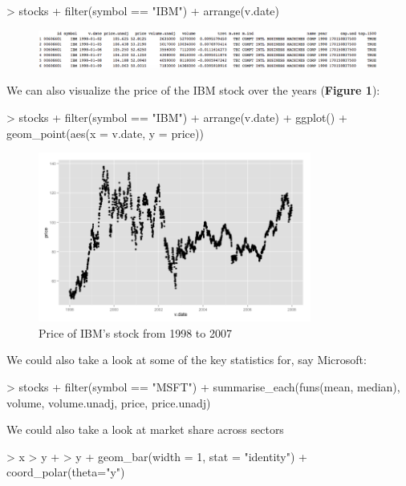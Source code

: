 \begin{example}
> stocks %
+  filter(symbol == "IBM") %
+  arrange(v.date) %
\end{example}

\begin{figure}[h!]
  \centering
    \includegraphics[width=1.2\textwidth]{IBM1}
\end{figure}

\noindent We can also visualize the price of the IBM stock over the years (\textbf{Figure 1}):

\begin{example}
> stocks %
+  filter(symbol == "IBM") %
+  arrange(v.date) %
+  ggplot() + geom_point(aes(x = v.date, y = price))
\end{example}

\begin{figure}[h!]
  \centering
    \includegraphics[width=0.8\textwidth]{IBM2}
  \caption{Price of IBM's stock from 1998 to 2007}
\end{figure}

\noindent We could also take a look at some of the key statistics for, say Microsoft: 

\begin{example}
> stocks %
+  filter(symbol == "MSFT") %
+  summarise_each(funs(mean, median), volume, volume.unadj, price, price.unadj)
\end{example}

\noindent We could also take a look at market share across sectors

\begin{example}
> x %
> y %
+   %
> y %
+   geom_bar(width = 1, stat = "identity") + coord_polar(theta="y") 
\end{example}

